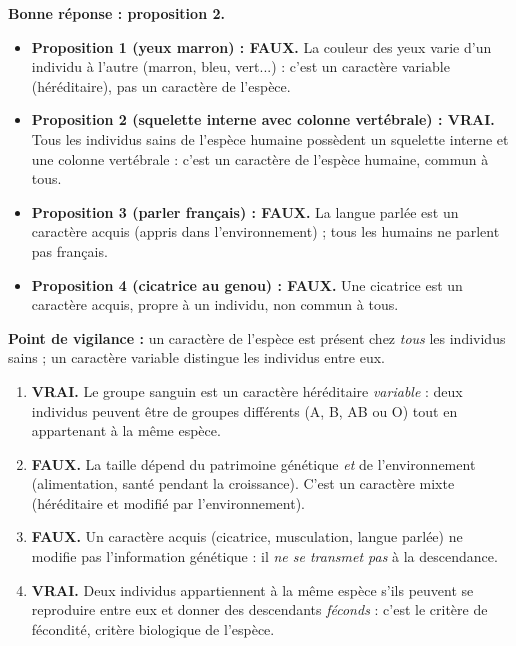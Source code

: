 \documentclass[11pt]{article}
\newcommand{\cle}[1]{{\popxbold\color{popdark}#1}}
\begin{document}
\begin{corrige}
\textbf{Bonne réponse : proposition 2.}

\begin{itemize}
    \item \textbf{Proposition 1 (yeux marron) : FAUX.} La couleur des yeux varie d'un individu à l'autre (marron, bleu, vert...) : c'est un \cle{caractère variable} (héréditaire), pas un caractère de l'espèce.
    \item \textbf{Proposition 2 (squelette interne avec colonne vertébrale) : VRAI.} Tous les individus sains de l'espèce humaine possèdent un squelette interne et une colonne vertébrale : c'est un \cle{caractère de l'espèce humaine}, commun à tous.
    \item \textbf{Proposition 3 (parler français) : FAUX.} La langue parlée est un \cle{caractère acquis} (appris dans l'environnement) ; tous les humains ne parlent pas français.
    \item \textbf{Proposition 4 (cicatrice au genou) : FAUX.} Une cicatrice est un caractère acquis, propre à un individu, non commun à tous.
\end{itemize}

\textbf{Point de vigilance :} un caractère de l'espèce est présent chez \emph{tous} les individus sains ; un caractère variable distingue les individus entre eux.
\end{corrige}

\begin{corrige}
\begin{enumerate}
    \item \textbf{VRAI.} Le groupe sanguin est un caractère héréditaire \emph{variable} : deux individus peuvent être de groupes différents (A, B, AB ou O) tout en appartenant à la même espèce.
    \item \textbf{FAUX.} La taille dépend du patrimoine génétique \emph{et} de l'environnement (alimentation, santé pendant la croissance). C'est un caractère mixte (héréditaire et modifié par l'environnement).
    \item \textbf{FAUX.} Un caractère acquis (cicatrice, musculation, langue parlée) ne modifie pas l'information génétique : il \emph{ne se transmet pas} à la descendance.
    \item \textbf{VRAI.} Deux individus appartiennent à la même espèce s'ils peuvent se reproduire entre eux et donner des descendants \emph{féconds} : c'est le \cle{critère de fécondité}, critère biologique de l'espèce.
\end{enumerate}
\end{corrige}
\end{document}
